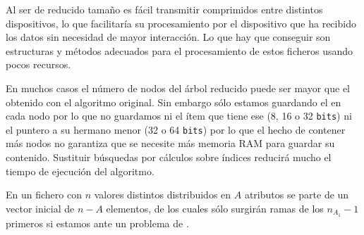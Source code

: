 Al ser de reducido tamaño es fácil transmitir \catalogos comprimidos entre distintos dispositivos, lo que facilitaría su procesamiento por el dispositivo que ha recibido los datos sin necesidad de mayor interacción. Lo que hay que conseguir son estructuras y métodos adecuados para el procesamiento de estos ficheros usando pocos recursos.

En muchos casos el número de nodos del árbol reducido puede ser mayor que el obtenido con el algoritmo original. Sin embargo sólo estamos guardando el \soporte en cada nodo por lo que no guardamos ni el ítem que tiene ese \soporte (8, 16 o 32 \texttt{bits}) ni el puntero a su hermano menor (32 o 64 \texttt{bits}) por lo que el hecho de contener más nodos no garantiza que se necesite más memoria RAM para guardar su contenido. Sustituir búsquedas por cálculos sobre índices reducirá mucho el tiempo de ejecución del algoritmo.











En un fichero con $n$ valores distintos distribuidos en $A$ atributos se parte de un vector inicial de $n - A$ elementos, de los cuales sólo surgirán ramas de los $n_{A_1} - 1$ primeros si estamos ante un problema de \clasificacion.

